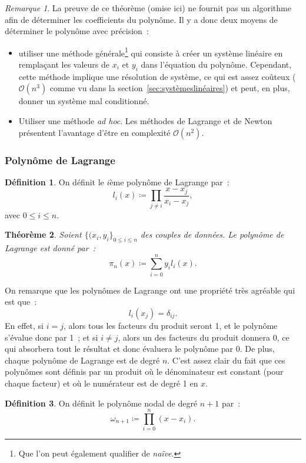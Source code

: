 \documentclass{article}
\newtheorem{thm}{Théorème}[section]
\theoremstyle{definition}
\newtheorem{déf}[thm]{Définition}
\theoremstyle{remark}
\newtheorem*{rmq}{Remarque}
\begin{document}
		\begin{rmq} La preuve de ce théorème (omise ici) ne fournit pas un algorithme afin de déterminer les coefficients du polynôme. Il y a donc deux moyens
		de déterminer le polynôme avec précision~:
		\begin{itemize}
			\item utiliser une méthode générale\footnote{Que l'on peut également qualifier de \emph{naïve}.} qui consiste à créer un système linéaire en
				remplaçant les valeurs de $x_i$ et $y_i$ dans l'équation du polynôme. Cependant, cette méthode implique une résolution de système, ce qui
				est assez coûteux ($\mathcal O(n^3)$ comme vu dans la section~\ref{sec:systèmeslinéaires}) et peut, en plus, donner un système mal conditionné.
			\item Utiliser une méthode \emph{ad hoc}. Les méthodes de Lagrange et de Newton présentent l'avantage d'être en complexité $\mathcal O(n^2)$.
		\end{itemize}
		\end{rmq}

		\subsubsection{Polynôme de Lagrange}
		\begin{déf} On définit le $i$ème polynôme de Lagrange par~:
		\[l_i(x) \coloneqq \prod_{j \neq i}\frac {x-x_j}{x_i-x_j},\]
		avec $0 \leq i \leq n$.
		\end{déf}

		\begin{thm} Soient $\{(x_i, y_i\}_{0 \leq i \leq n}$ des couples de données. Le polynôme de Lagrange est donné par~:
		\[\pi_n(x) \coloneqq \sum_{i=0}^ny_il_i(x).\]
		\end{thm}

		On remarque que les polynômes de Lagrange ont une propriété très agréable qui est que~:
		\[l_i(x_j) = \delta_{ij}.\]
		En effet, si $i = j$, alors tous les facteurs du produit seront 1, et le polynôme s'évalue donc par 1~; et si $i \neq j$, alors un des facteurs du
		produit donnera 0, ce qui absorbera tout le résultat et donc évaluera le polynôme par 0. De plus, chaque polynôme de Lagrange est de degré $n$.
		C'est assez clair du fait que ces polynômes sont définis par un produit où le dénominateur est constant (pour chaque facteur) et où le numérateur
		est de degré 1 en $x$.

		\begin{déf} On définit le polynôme nodal de degré $n+1$ par~:
		\[\omega_{n+1} \coloneqq \prod_{i=0}^n(x-x_i).\]
		\end{déf}
\end{document}
